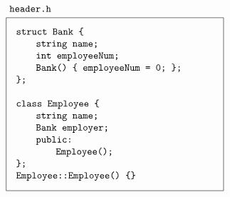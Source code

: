 \documentclass[a4paper,12pt]{article}
\newcommand\indd{${}$\hspace{20pt}}
\begin{document}
\[{\begin{tikzpicture}
\node[draw,anchor=north,inner sep=10pt] (head) at (9,0) {\parbox{7cm}{\raggedright
\texttt{struct Bank \{}\linebreak
\indd\texttt{string name;} \linebreak
\indd\texttt{int employeeNum;} \linebreak
\indd\texttt{Bank() \{ employeeNum = 0; \};} \linebreak
\texttt{\};}\linebreak
\linebreak
\texttt{class Employee \{}\linebreak
\indd\texttt{string name;} \linebreak
\indd\texttt{Bank employer;} \linebreak
\indd\texttt{public:} \linebreak
\indd\indd\texttt{Employee();} \linebreak
\texttt{\};}\linebreak
\texttt{Employee::Employee() \{\}}
}};
\node[anchor=south west] at (head.north west) {\texttt{header.h\vphantom{p}}};
\end{tikzpicture}
}
\]
\end{document}
